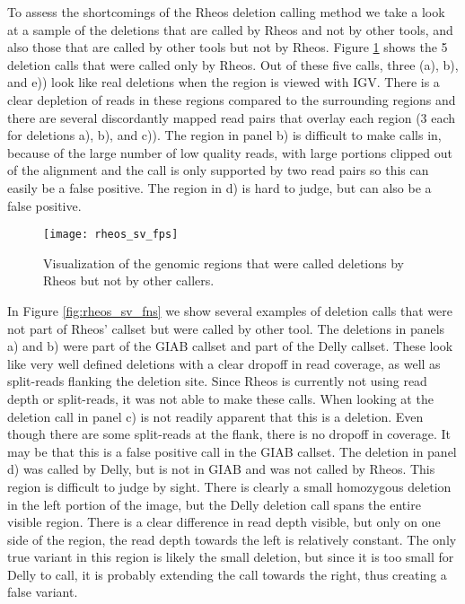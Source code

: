 To assess the shortcomings of the Rheos deletion calling method we take a look at a sample of the deletions that are called by Rheos and not by other tools, and also those that are called by other tools but not by Rheos. Figure \ref{fig:rheos_sv_fps} shows the 5 deletion calls that were called only by Rheos. Out of these five calls, three (a), b), and e)) look like real deletions when the region is viewed with IGV. There is a clear depletion of reads in these regions compared to the surrounding regions and there are several discordantly mapped read pairs that overlay each region (3 each for deletions a), b), and c)). The region in panel b) is difficult to make calls in, because of the large number of low quality reads, with large portions clipped out of the alignment and the call is only supported by two read pairs so this can easily be a false positive. The region in d) is hard to judge, but can also be a false positive. 

\begin{figure}[h!]
    \texttt{[image: rheos\_sv\_fps]}
    \centering
    \caption {Visualization of the genomic regions that were called deletions by Rheos but not by other callers.}
    \label{fig:rheos_sv_fps}
\end{figure}

In Figure \ref{fig:rheos_sv_fns} we show several examples of deletion calls that were not part of Rheos' callset but were called by other tool. The deletions in panels a) and b) were part of the GIAB callset and part of the Delly callset. These look like very well defined deletions with a clear dropoff in read coverage, as well as split-reads flanking the deletion site. Since Rheos is currently not using read depth or split-reads, it was not able to make these calls. When looking at the deletion call in panel c) is not readily apparent that this is a deletion. Even though there are some split-reads at the flank, there is no dropoff in coverage. It may be that this is a false positive call in the GIAB callset. The deletion in panel d) was called by Delly, but is not in GIAB and was not called by Rheos. This region is difficult to judge by sight. There is clearly a small homozygous deletion in the left portion of the image, but the Delly deletion call spans the entire visible region. There is a clear difference in read depth visible, but only on one side of the region, the read depth towards the left is relatively constant. The only true variant in this region is likely the small deletion, but since it is too small for Delly to call, it is probably extending the call towards the right, thus creating a false variant. 

